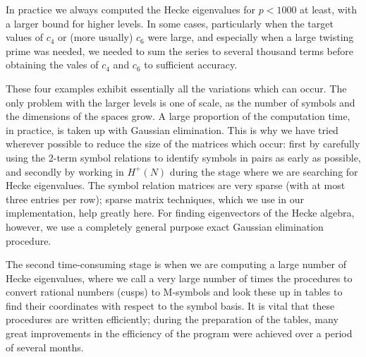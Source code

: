 \bigskip
\goodbreak

In practice we always computed the Hecke eigenvalues for $p<1000$ at 
least, with a larger bound for higher levels.  In some cases, 
particularly when the target values of $c_4$ or (more usually) $c_6$ were 
large, and especially when a large twisting prime was needed, we needed 
to sum the series to several thousand terms before obtaining the vales of 
$c_4$ and $c_6$ to sufficient accuracy.

These four examples exhibit essentially all the variations which can
occur.  The only problem with the larger levels is one of scale, as
the number of symbols and the dimensions of the spaces grow.  A large
proportion of the computation time, in practice, is taken up with
Gaussian elimination.  This is why we have tried wherever possible to
reduce the size of the matrices which occur: first by carefully using
the 2-term symbol relations to identify symbols in pairs as early as
possible, and secondly by working in $H^+(N)$ during the stage where
we are searching for Hecke eigenvalues.  The symbol relation matrices
are very sparse (with at most three entries per row); sparse matrix
techniques, which we use in our implementation, help greatly here.
For finding eigenvectors of the Hecke algebra, however, we use a
completely general purpose exact Gaussian elimination procedure.

The second time-consuming stage is when we are computing a large number 
of Hecke eigenvalues, where we call a very large number of times the 
procedures to convert rational numbers (cusps) to M-symbols and look 
these up in tables to find their coordinates with respect to the symbol 
basis.  It is vital that these procedures are written efficiently; during 
the preparation of the tables, many great improvements in the efficiency 
of the program were achieved over a period of several months.


\enddocument
